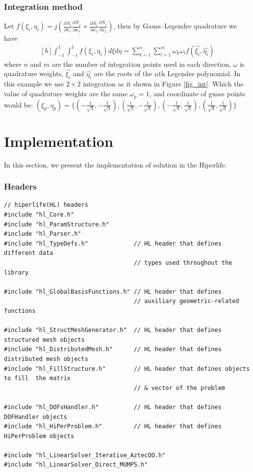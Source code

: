 \documentclass[]{article}
\begin{document}
\subsubsection{Integration method} \label{sec: int}
Let $f(\xi_{i},\eta_{i})=j(\frac{\partial N_{i}}{\partial x_{1}}
\frac{\partial N_{j}}{\partial x_{1}}+\frac{\partial N_{i}}{\partial x_{2}} 
\frac{\partial N_{j}}{\partial x_{2}})$, then by Gauss–Legendre quadrature we have
\begin{equation}\label{eq19}
	\begin{aligned}[b]
		\int_{-1}^1 \int_{-1}^1 f(\xi_{i},\eta_{i}) d\xi d\eta = \sum_{k=1}^{n}\sum_{l=1}^{m} \omega_{k}\omega_{l}f(\hat{\xi_{i}},\hat{\eta_{i}})
	\end{aligned}
\end{equation}
where $n$ and $m$ are the number of integration points used in each direction, $\omega$ is quadrature weights, $\hat{\xi_{i}}$ and $\hat{\eta_{i}}$ are the roots of the $n$th Legendre polynomial. In this example we use $2 \times 2$ integration as it shown in Figure \ref{fig_int}. Which the value of  quadrature weights are the same $\omega_{p}=1$, and coordinate of guass points would be:  $(\xi_{p}, \eta_{p})=\{(-\frac{1}{\sqrt{3}},-\frac{1}{\sqrt{3}}),  (\frac{1}{\sqrt{3}}, -\frac{1}{\sqrt{3}}),  (-\frac{1}{\sqrt{3}}, \frac{1}{\sqrt{3}}), (\frac{1}{\sqrt{3}}, \frac{1}{\sqrt{3}})\}$

\section{Implementation} \label{sec: imp}
In this section, we present the implementation of solution in the Hiperlife.
\nolinenumbers
\subsubsection{Headers} \label{sec: hdr}

\begin{lstlisting}
// hiperlife(HL) headers
#include "hl_Core.h"
#include "hl_ParamStructure.h"
#include "hl_Parser.h"
#include "hl_TypeDefs.h"             // HL header that defines different data
                                     // types used throughout the library
                                     
#include "hl_GlobalBasisFunctions.h" // HL header that defines
                                     // auxiliary geometric-related functions
                                     
#include "hl_StructMeshGenerator.h"  // HL header that defines structured mesh objects
#include "hl_DistributedMesh.h"      // HL header that defines distributed mesh objects
#include "hl_FillStructure.h"        // HL header that defines objects to fill  the matrix
                                     // & vector of the problem
                                     
#include "hl_DOFsHandler.h"          // HL header that defines DOFHandler objects
#include "hl_HiPerProblem.h"         // HL header that defines HiPerProblem objects

#include "hl_LinearSolver_Iterative_AztecOO.h"
#include "hl_LinearSolver_Direct_MUMPS.h"
\end{lstlisting}
\end{document}
